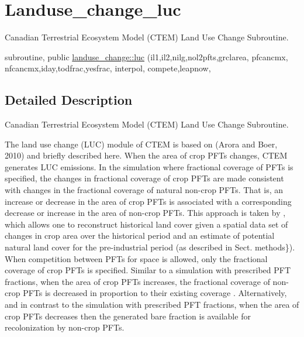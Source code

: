 \hypertarget{group__landuse__change__luc}{}\section{Landuse\+\_\+change\+\_\+luc}
\label{group__landuse__change__luc}


Canadian Terrestrial Ecosystem Model (C\+T\+E\+M) Land Use Change Subroutine.  


\begin{DoxyCompactItemize}
\item 
subroutine, public \hyperlink{group__landuse__change__luc_gaca416d24f2714c7a7de32fb9fb1033db}{landuse\+\_\+change\+::luc} (il1,il2,nilg,nol2pfts,grclarea, pfcancmx, nfcancmx,iday,todfrac,yesfrac, interpol, compete,leapnow,
\end{DoxyCompactItemize}


\subsection{Detailed Description}
Canadian Terrestrial Ecosystem Model (C\+T\+E\+M) Land Use Change Subroutine. 

The land use change (L\+U\+C) module of C\+T\+E\+M is based on (Arora and Boer, 2010) \cite{Arora2010-416} and briefly described here. When the area of crop P\+F\+Ts changes, C\+T\+E\+M generates L\+U\+C emissions. In the simulation where fractional coverage of P\+F\+Ts is specified, the changes in fractional coverage of crop P\+F\+Ts are made consistent with changes in the fractional coverage of natural non-\/crop P\+F\+Ts. That is, an increase or decrease in the area of crop P\+F\+Ts is associated with a corresponding decrease or increase in the area of non-\/crop P\+F\+Ts. This approach is taken by \cite{Wang2006-he}, which allows one to reconstruct historical land cover given a spatial data set of changes in crop area over the historical period and an estimate of potential natural land cover for the pre-\/industrial period (as described in Sect. methods\}). When competition between P\+F\+Ts for space is allowed, only the fractional coverage of crop P\+F\+Ts is specified. Similar to a simulation with prescribed P\+F\+T fractions, when the area of crop P\+F\+Ts increases, the fractional coverage of non-\/crop P\+F\+Ts is decreased in proportion to their existing coverage \cite{Wang2006-he}. Alternatively, and in contrast to the simulation with prescribed P\+F\+T fractions, when the area of crop P\+F\+Ts decreases then the generated bare fraction is available for recolonization by non-\/crop P\+F\+Ts.

